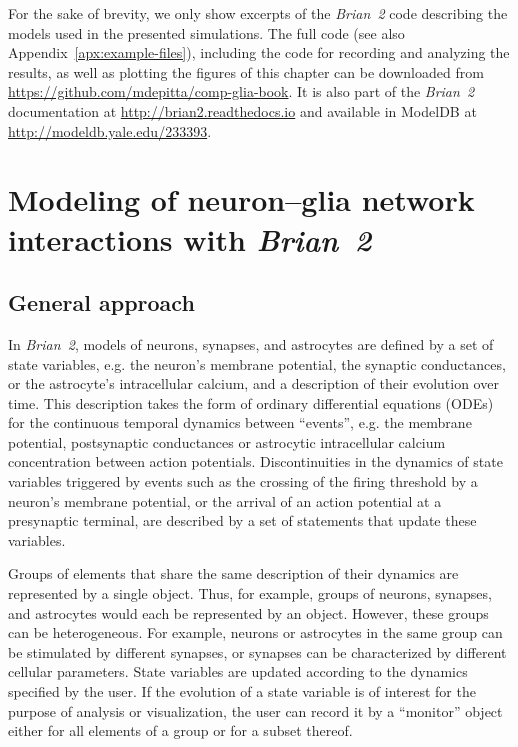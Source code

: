 \documentclass[a4paper, 11pt]{article}
\newcommand{\brian}{\emph{Brian~2}\xspace}
\newcommand*{\appref}[1]{Appendix~\ref{#1}}
\begin{document}
For the sake of brevity, we only show excerpts of the \brian code describing the models used in the presented simulations.
The full code (see also \appref{apx:example-files}), including the code for recording and analyzing the results, as well as plotting the figures of this chapter can be downloaded from \url{https://github.com/mdepitta/comp-glia-book}. It is also part of the \brian documentation at \url{http://brian2.readthedocs.io} and available in ModelDB \citep{McDougal2017} at \url{http://modeldb.yale.edu/233393}.

\section{Modeling of neuron--glia network interactions with \brian}
\subsection{General approach}
In \brian, models of neurons, synapses, and astrocytes are defined by a set of state variables, e.g. the neuron's membrane potential, the synaptic conductances, or the astrocyte's intracellular calcium, and a description of their evolution over time.
This description takes the form of ordinary differential equations (ODEs) for the continuous temporal dynamics between ``events'', e.g. the membrane potential, postsynaptic conductances or astrocytic intracellular calcium concentration between action potentials.
Discontinuities in the dynamics of state variables triggered by events such as the crossing of the firing threshold by a neuron's membrane potential, or the arrival of an action potential at a presynaptic terminal, are described by a set of statements that update these variables.

Groups of elements that share the same description of their dynamics are represented by a single object.
Thus, for example, groups of neurons, synapses, and astrocytes would each be represented by an object.
However, these groups can be heterogeneous.
For example, neurons or astrocytes in the same group can be stimulated by different synapses, or synapses can be characterized by different cellular parameters.
State variables are updated according to the dynamics specified by the user.
If the evolution of a state variable is of interest for the purpose of analysis or visualization, the user can record it by a ``monitor'' object either for all elements of a group or for a subset thereof.
\end{document}
